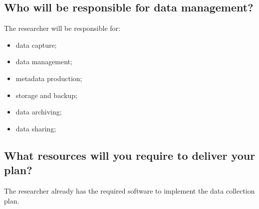 \documentclass{article} %
\begin{document}
\subsection{Who will be responsible for data management?}

The researcher will be responsible for:

\begin{itemize}
    \item data capture;
    \item data management;
    \item metadata production;
    \item storage and backup;
    \item data archiving;
    \item data sharing;
\end{itemize}

\subsection{What resources will you require to deliver your plan?}

The researcher already has the required software to implement the data collection plan.
\end{document}
